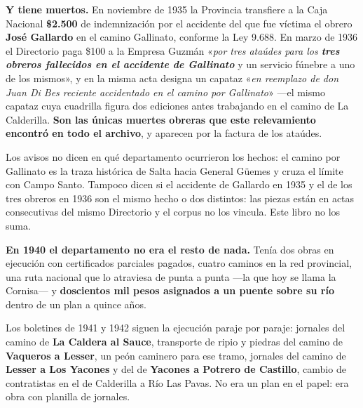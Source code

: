 \textbf{Y tiene muertos.} En noviembre de 1935 la Provincia transfiere a la Caja Nacional
\textbf{\$2.500} de indemnización por el accidente del que fue víctima el obrero \textbf{José
Gallardo} en el camino Gallinato, conforme la Ley 9.688. En marzo de 1936 el Directorio paga
\$100 a la Empresa Guzmán «\textit{por tres ataúdes para los \textbf{tres obreros fallecidos en
el accidente de Gallinato}} y un servicio fúnebre a uno de los mismos», y en la misma acta
designa un capataz «\textit{en reemplazo de don Juan Di Bes reciente accidentado en el camino
por Gallinato}» ---el mismo capataz cuya cuadrilla figura dos ediciones antes trabajando en el
camino de La Calderilla. \textbf{Son las únicas muertes obreras que este relevamiento encontró
en todo el archivo}, y aparecen por la factura de los ataúdes.

\begin{cautela}
Los avisos no dicen en qué departamento ocurrieron los hechos: el camino por Gallinato es la
traza histórica de Salta hacia General Güemes y cruza el límite con Campo Santo. Tampoco dicen
si el accidente de Gallardo en 1935 y el de los tres obreros en 1936 son el mismo hecho o dos
distintos: las piezas están en actas consecutivas del mismo Directorio y el corpus no los
vincula. Este libro no los suma.
\end{cautela}

\textbf{En 1940 el departamento no era el resto de nada.} Tenía dos obras en ejecución con
certificados parciales pagados, cuatro caminos en la red provincial, una ruta nacional que lo
atraviesa de punta a punta ---la que hoy se llama la Cornisa--- y \textbf{doscientos mil pesos
asignados a un puente sobre su río} dentro de un plan a quince años.

Los boletines de 1941 y 1942 siguen la ejecución paraje por paraje: jornales del camino de
\textbf{La Caldera al Sauce}, transporte de ripio y piedras del camino de \textbf{Vaqueros a
Lesser}, un peón caminero para ese tramo, jornales del camino de \textbf{Lesser a Los Yacones} y
del de \textbf{Yacones a Potrero de Castillo}, cambio de contratistas en el de Calderilla a Río
Las Pavas. No era un plan en el papel: era obra con planilla de jornales.

